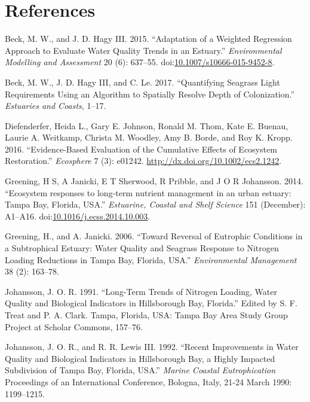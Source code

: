 \documentclass[]{article}
\begin{document}
\section*{References}\label{references}

\hypertarget{refs}{}
\hypertarget{ref-Beck15}{}
Beck, M. W., and J. D. Hagy III. 2015. ``Adaptation of a Weighted
Regression Approach to Evaluate Water Quality Trends in an Estuary.''
\emph{Environmental Modelling and Assessment} 20 (6): 637--55.
doi:\href{https://doi.org/10.1007/s10666-015-9452-8}{10.1007/s10666-015-9452-8}.

\hypertarget{ref-Beck17c}{}
Beck, M. W., J. D. Hagy III, and C. Le. 2017. ``Quantifying Seagrass
Light Requirements Using an Algorithm to Spatially Resolve Depth of
Colonization.'' \emph{Estuaries and Coasts}, 1--17.

\hypertarget{ref-Diefenderfer16}{}
Diefenderfer, Heida L., Gary E. Johnson, Ronald M. Thom, Kate E. Buenau,
Laurie A. Weitkamp, Christa M. Woodley, Amy B. Borde, and Roy K. Kropp.
2016. ``Evidence-Based Evaluation of the Cumulative Effects of Ecosystem
Restoration.'' \emph{Ecosphere} 7 (3): e01242.
\url{http://dx.doi.org/10.1002/ecs2.1242}.

\hypertarget{ref-Greening2014}{}
Greening, H S, A Janicki, E T Sherwood, R Pribble, and J O R Johansson.
2014. ``Ecosystem responses to long-term nutrient management in an urban
estuary: Tampa Bay, Florida, USA.'' \emph{Estuarine, Coastal and Shelf
Science} 151 (December): A1--A16.
doi:\href{https://doi.org/10.1016/j.ecss.2014.10.003}{10.1016/j.ecss.2014.10.003}.

\hypertarget{ref-Greening06}{}
Greening, H., and A. Janicki. 2006. ``Toward Reversal of Eutrophic
Conditions in a Subtrophical Estuary: Water Quality and Seagrass
Response to Nitrogen Loading Reductions in Tampa Bay, Florida, USA.''
\emph{Environmental Management} 38 (2): 163--78.

\hypertarget{ref-Johansson91}{}
Johansson, J. O. R. 1991. ``Long-Term Trends of Nitrogen Loading, Water
Quality and Biological Indicators in Hillsborough Bay, Florida.'' Edited
by S. F. Treat and P. A. Clark. Tampa, Florida, USA: Tampa Bay Area
Study Group Project at Scholar Commons, 157--76.

\hypertarget{ref-Johansson92}{}
Johansson, J. O. R., and R. R. Lewis III. 1992. ``Recent Improvements in
Water Quality and Biological Indicators in Hillsborough Bay, a Highly
Impacted Subdivision of Tampa Bay, Florida, USA.'' \emph{Marine Coastal
Eutrophication} Proceedings of an International Conference, Bologna,
Italy, 21-24 March 1990: 1199--1215.
\end{document}
